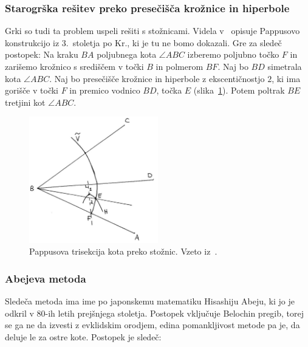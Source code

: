 
\subsubsection*{Starogrška rešitev preko presečišča krožnice in hiperbole}

Grki so tudi ta problem uspeli rešiti s stožnicami. Videla v~\cite[str.\ 6--7]{videla1997} opisuje Pappusovo konstrukcijo iz $3$.\ stoletja po Kr., ki je tu ne bomo dokazali. Gre za sledeč postopek: Na kraku $BA$ poljubnega kota $\angle ABC$ izberemo poljubno točko $F$ in zarišemo krožnico s središčem v točki $B$ in polmerom $BF$. Naj bo $BD$ simetrala kota $\angle ABC$. Naj bo presečišče krožnice in hiperbole z ekscentičnostjo $2$, ki ima gorišče v točki $F$ in premico vodnico $BD$, točka $E$ (slika~\ref{fig:trisection_gr}). Potem poltrak $BE$ tretjini kot $\angle ABC$.

\begin{figure}[h]
    \centering
    \includegraphics[width=0.5\textwidth]{images/starogr_problemi/trisection_grska.png}
    \caption[Pappusova trisekcija kota]{Pappusova trisekcija kota preko stožnic. Vzeto iz~\cite[str.\ 7]{videla1997}.}
    \label{fig:trisection_gr}
\end{figure}

\subsubsection*{Abejeva metoda}

Sledeča metoda ima ime po japonskemu matematiku Hisashiju Abeju, ki jo je odkril v $80$-ih letih prejšnjega stoletja. Postopek vključuje Belochin pregib, torej se ga ne da izvesti z evklidskim orodjem, edina pomankljivost metode pa je, da deluje le za ostre kote. Postopek je sledeč:

